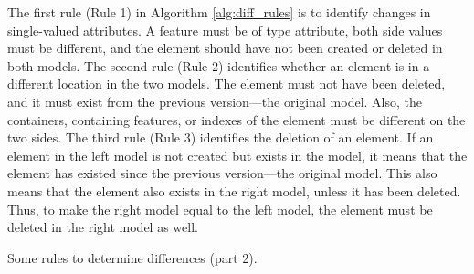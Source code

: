 The first rule (Rule 1) in Algorithm \ref{alg:diff_rules} is to identify changes in single-valued attributes. A feature must be of type \textsf{attribute}, both side values must be different, and the element should have not been created or deleted in both models. The second rule (Rule 2) identifies whether an element is in a different location in the two models. The element must not have been deleted, and it must exist from the previous version—the original model. Also, the containers, containing features, or indexes of the element must be different on the two sides. The third rule (Rule 3) identifies the deletion of an element. If an element in the left model is not created but exists in the model, it means that the element has existed since the previous version—the original model. This also means that the element also exists in the right model, unless it has been deleted. Thus, to make the right model equal to the left model, the element must be deleted in the right model as well.

\IncMargin{1.5em}
\begin{algorithm}[H]
  \begin{footnotesize}
  \end{footnotesize}
  \caption{Some rules to determine differences (part 2).}
  \label{alg:diff_rules_2}
\end{algorithm}
\DecMargin{1.5em}

